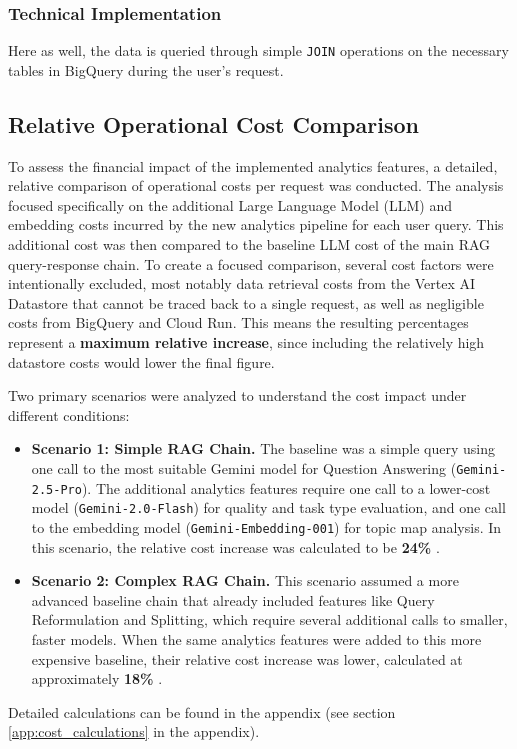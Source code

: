 \documentclass[
	english,
	ruledheaders=section,%
	class=report,%
	thesis={type=bachelor},%
	accentcolor=1b,%
	custommargins=true,%
	marginpar=false,%
	parskip=half-,%
	fontsize=11pt,%
	DIV=14,
]{tudapub}
\begin{document}
\subsubsection{Technical Implementation}
Here as well, the data is queried through simple \texttt{JOIN} operations on the necessary tables in BigQuery during the user's request.

\subsection{Relative Operational Cost Comparison}
To assess the financial impact of the implemented analytics features, a detailed, relative comparison of operational costs per request was conducted. The analysis focused specifically on the additional Large Language Model (LLM) and embedding costs incurred by the new analytics pipeline for each user query. This additional cost was then compared to the baseline LLM cost of the main RAG query-response chain. To create a focused comparison, several cost factors were intentionally excluded, most notably data retrieval costs from the Vertex AI Datastore that cannot be traced back to a single request, as well as negligible costs from BigQuery and Cloud Run. This means the resulting percentages represent a \textbf{maximum relative increase}, since including the relatively high datastore costs would lower the final figure.

Two primary scenarios were analyzed to understand the cost impact under different conditions:

\begin{itemize}
    \item \textbf{Scenario 1: Simple RAG Chain.} The baseline was a simple query using one call to the most suitable Gemini model for Question Answering (\texttt{Gemini-2.5-Pro}). The additional analytics features require one call to a lower-cost model (\texttt{Gemini-2.0-Flash}) for quality and task type evaluation, and one call to the embedding model (\texttt{Gemini-Embedding-001}) for topic map analysis. In this scenario, the relative cost increase was calculated to be \textbf{24\%} \parencite{GoogleGeminiPricing}.

    \item \textbf{Scenario 2: Complex RAG Chain.} This scenario assumed a more advanced baseline chain that already included features like Query Reformulation and Splitting, which require several additional calls to smaller, faster models. When the same analytics features were added to this more expensive baseline, their relative cost increase was lower, calculated at approximately \textbf{18\%} \parencite{GoogleGeminiPricing}.
\end{itemize}
Detailed calculations can be found in the appendix (see section \ref{app:cost_calculations} in the appendix).
\end{document}
